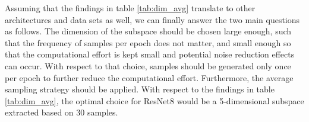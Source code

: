 \documentclass[11pt, a4paper]{article}
\begin{document}

Assuming that the findings in table \ref{tab:dim_avg} translate to other architectures and data sets as well, we can finally answer the two main questions as follows. The dimension of the subspace should be chosen large enough, such that the frequency of samples per epoch does not matter, and small enough so that the computational effort is kept small and potential noise reduction effects can occur. With respect to that choice, samples should be generated only once per epoch to further reduce the computational effort. Furthermore, the average sampling strategy should be applied. With respect to the findings in table \ref{tab:dim_avg}, the optimal choice for ResNet8 would be a 5-dimensional subspace extracted based on 30 samples.
\end{document}
